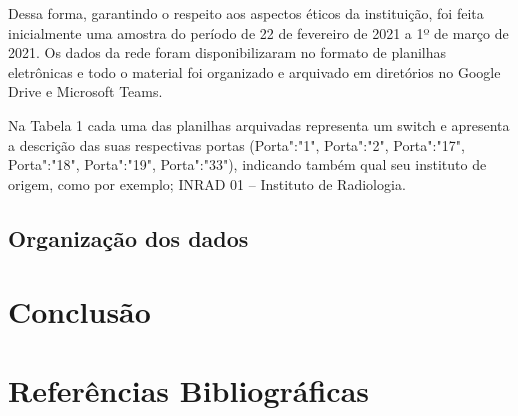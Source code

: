 \documentclass[
	12pt,				%
	openright,			%
	twoside,			%
	a4paper,			%
	english,			%
	french,				%
	spanish,			%
	brazil				%
	]{abntex2}
\begin{document}
Dessa forma, garantindo o respeito aos aspectos éticos da instituição, foi feita inicialmente uma amostra do período de 22 de fevereiro de 2021 a 1º de março de 2021. Os dados da rede foram disponibilizaram no formato de planilhas eletrônicas e todo o material foi organizado e arquivado em diretórios no Google Drive e Microsoft Teams.

Na Tabela 1 cada uma das planilhas arquivadas representa um switch e apresenta a descrição das suas respectivas portas (Porta":"1", Porta":"2", Porta":"17", Porta":"18", Porta":"19", Porta":"33"), indicando também qual seu instituto de origem, como por exemplo; INRAD 01 – Instituto de Radiologia.


\section{Organização dos dados}



\chapter{Conclusão}

\lipsum[31-31]

\postextual

%

\chapter{Referências Bibliográficas}
%




%
%
\end{document}
